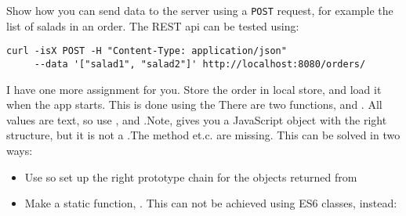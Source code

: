 \documentclass[fleqn, article, a4paper]{memoir}
\begin{document}
\begin{Assignments}
\item Show how you can send data to the server using a \texttt{POST} request, for example the list of salads in an order. The REST api can be tested using:
\\ \noindent \begin{verbatim}
curl -isX POST -H "Content-Type: application/json"
     --data '["salad1", "salad2"]' http://localhost:8080/orders/
\end{verbatim}

\item I have one more assignment for you. Store the order in local store, and load it when the app starts. This is done using the  There are two functions,  and . All values are text, so use , and .Note,  gives you a JavaScript object with the right structure, but it is not a .The  method et.c. are missing. This can be solved in two ways:
\begin{itemize}
\item Use  so set up the right prototype chain for the objects returned from 
\item Make a static function, . This can not be achieved using ES6 classes, instead: 
\end{itemize}
\end{Assignments}


\end{document}
